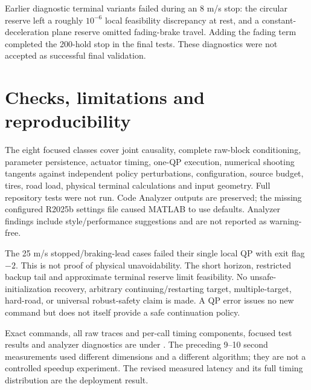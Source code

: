 \documentclass[11pt]{article}
\begin{document}
Earlier diagnostic terminal variants failed during an 8 m/s stop: the circular
reserve left a roughly $10^{-6}$ local feasibility discrepancy at rest, and a
constant-deceleration plane reserve omitted fading-brake travel. Adding the
fading term completed the 200-hold stop in the final tests. These diagnostics
were not accepted as successful final validation.

\section*{Checks, limitations and reproducibility}
The eight focused classes cover joint causality, complete raw-block conditioning,
parameter persistence, actuator timing, one-QP execution, numerical shooting
tangents against independent policy perturbations, configuration, source budget,
tires, road load, physical terminal calculations and input geometry. Full
repository tests were not run. Code Analyzer outputs are preserved; the missing
configured R2025b settings file caused MATLAB to use defaults. Analyzer findings
include style/performance suggestions and are not reported as warning-free.

The 25 m/s stopped/braking-lead cases failed their single local QP with exit
flag $-2$. This is not proof of physical unavoidability. The short horizon,
restricted backup tail and approximate terminal reserve limit feasibility.
No unsafe-initialization recovery, arbitrary continuing/restarting target,
multiple-target, hard-road, or universal robust-safety claim is made. A QP error
issues no new command but does not itself provide a safe continuation policy.

Exact commands, all raw traces and per-call timing components, focused test
results and analyzer diagnostics are under .
The preceding 9--10 second measurements used different dimensions and a different
algorithm; they are not a controlled speedup experiment. The revised measured
latency and its full timing distribution are the deployment result.
\end{document}

